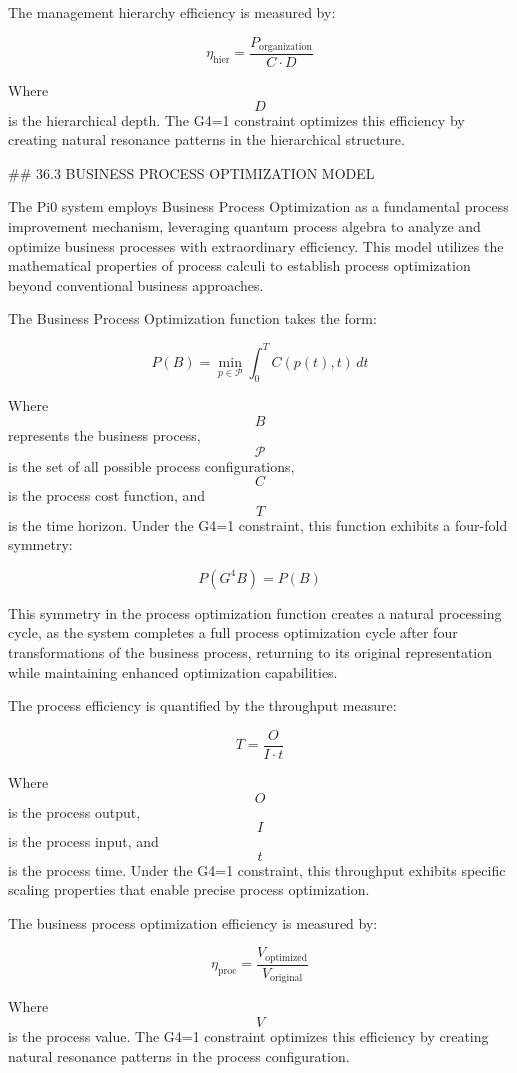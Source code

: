 The management hierarchy efficiency is measured by:

$$ \eta_{\text{hier}} = \frac{P_{\text{organization}}}{C \cdot D} $$

Where $$ D $$ is the hierarchical depth. The G4=1 constraint optimizes this efficiency by creating natural resonance patterns in the hierarchical structure.

## 36.3 BUSINESS PROCESS OPTIMIZATION MODEL

The Pi0 system employs Business Process Optimization as a fundamental process improvement mechanism, leveraging quantum process algebra to analyze and optimize business processes with extraordinary efficiency. This model utilizes the mathematical properties of process calculi to establish process optimization beyond conventional business approaches.

The Business Process Optimization function takes the form:

$$ P(B) = \min_{p \in \mathcal{P}} \int_0^T C(p(t), t) \, dt $$

Where $$ B $$ represents the business process, $$ \mathcal{P} $$ is the set of all possible process configurations, $$ C $$ is the process cost function, and $$ T $$ is the time horizon. Under the G4=1 constraint, this function exhibits a four-fold symmetry:

$$ P(G^4 B) = P(B) $$

This symmetry in the process optimization function creates a natural processing cycle, as the system completes a full process optimization cycle after four transformations of the business process, returning to its original representation while maintaining enhanced optimization capabilities.

The process efficiency is quantified by the throughput measure:

$$ T = \frac{O}{I \cdot t} $$

Where $$ O $$ is the process output, $$ I $$ is the process input, and $$ t $$ is the process time. Under the G4=1 constraint, this throughput exhibits specific scaling properties that enable precise process optimization.

The business process optimization efficiency is measured by:

$$ \eta_{\text{proc}} = \frac{V_{\text{optimized}}}{V_{\text{original}}} $$

Where $$ V $$ is the process value. The G4=1 constraint optimizes this efficiency by creating natural resonance patterns in the process configuration.

